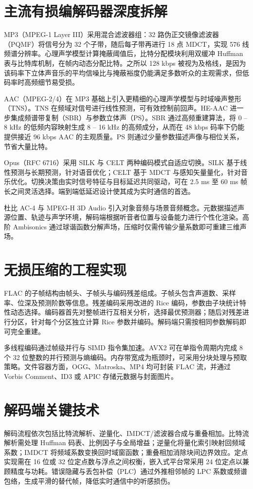 \chapter{主流有损编解码器深度拆解}
MP3（MPEG-1 Layer III）采用混合滤波器组：32 路伪正交镜像滤波器（PQMF）将信号分为 32 个子带，随后每子带再进行 18 点 MDCT，实现 576 线频谱分辨率。心理声学模型计算掩蔽阈值后，比特分配模块利用双缓冲 Huffman 表与比特库机制，在帧内动态分配比特。之所以 128 kbps 被视为及格线，是因为该码率下立体声音乐的平均信噪比与掩蔽裕度仍能满足多数听众的主观需求，但低码率时高频细节易受损。\par
AAC（MPEG-2/4）在 MP3 基础上引入更精细的心理声学模型与时域噪声整形（TNS）。TNS 在频域对信号进行线性预测，可有效控制前回声。HE-AAC 进一步集成频谱带复制（SBR）与参数立体声（PS）。SBR 通过高频重建算法，将 0 – 8 kHz 的低频内容映射生成 8 – 16 kHz 的高频成分，从而在 48 kbps 码率下仍能提供接近 96 kbps AAC 的主观质量。PS 则通过少量参数描述声像与相位关系，节省大量比特。\par
Opus（RFC 6716）采用 SILK 与 CELT 两种编码模式自适应切换。SILK 基于线性预测与长期预测，针对语音优化；CELT 基于 MDCT 与感知矢量量化，针对音乐优化。切换决策由实时信号特征与目标延迟共同驱动，可在 2.5 ms 至 60 ms 帧长之间灵活选择。端到端低延迟设计使其成为实时通信的首选。\par
杜比 AC-4 与 MPEG-H 3D Audio 引入对象音频与场景音频概念。元数据描述声源位置、轨迹与声学环境，解码端根据听音者位置与设备能力进行个性化渲染。高阶 Ambisonics 通过球谐函数分解声场，压缩时仅需传输少量系数即可重建三维声场。\par
\chapter{无损压缩的工程实现}
FLAC 的子帧结构由帧头、子帧头与编码残差组成。子帧头包含声道数、采样率、位深及预测阶数等信息。残差编码采用改进的 Rice 编码，参数由子块统计特性动态选择。编码器首先对整帧进行互相关分析，选择最优预测器；随后对残差进行分区，针对每个分区独立计算 Rice 参数并编码。解码端只需按相同参数解码即可完全重建。\par
多线程编码通过帧级并行与 SIMD 指令集加速。AVX2 可在单指令周期内完成 8 个 32 位整数的并行预测与熵编码。内存带宽成为瓶颈时，可采用分块处理与预取策略。文件容器方面，OGG、Matroska、MP4 均可封装 FLAC 流，并通过 Vorbis Comment、ID3 或 APIC 存储元数据与封面图片。\par
\chapter{解码端关键技术}
解码流程依次包括比特流解析、逆量化、IMDCT/滤波器合成与重叠相加。比特流解析需处理 Huffman 码表、比例因子与全局增益；逆量化将量化索引映射回频域系数；IMDCT 将频域系数变换回时域窗函数；重叠相加消除块间边界效应。定点实现需在 16 位或 32 位定点数与浮点之间权衡，嵌入式平台常采用 24 位定点以兼顾精度与功耗。错误隐藏与丢包补偿（PLC）通过外推相邻帧的 LPC 系数或频谱包络，生成平滑的替代帧，降低实时通信中的听感损伤。\par
